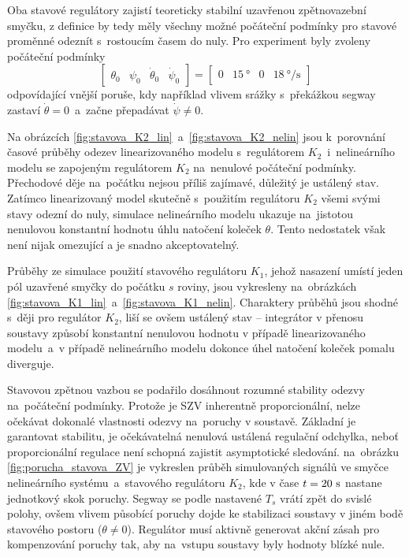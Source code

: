 \documentclass[conference]{IEEEtran}
\begin{document}
Oba stavové regulátory zajistí teoreticky stabilní uzavřenou zpětnovazební smyčku, z definice by tedy měly všechny možné počáteční
podmínky pro stavové proměnné odeznít s~rostoucím časem do nuly. Pro experiment byly zvoleny počáteční podmínky
\begin{equation*}
    \begin{bmatrix}
        \theta_0 & \psi_0 & \dot{\theta}_0 & \dot{\psi}_0
    \end{bmatrix} = \begin{bmatrix}
        0 & 15~\si{\degree} & 0 & 18~\si{\degree\per\second}
    \end{bmatrix}
\end{equation*}
odpovídající vnější poruše, kdy například vlivem srážky s~překážkou segway zastaví $\dot{\theta} = 0$~a~začne přepadávat $\dot{\psi} \neq 0$.


Na obrázcích \ref{fig:stavova_K2_lin}~a~\ref{fig:stavova_K2_nelin}
jsou k~porovnání časové průběhy odezev linearizovaného modelu s~regulátorem $K_2$~i~nelineárního modelu se zapojeným regulátorem $K_2$ na~nenulové počáteční podmínky.
Přechodové děje na~počátku nejsou příliš zajímavé, důležitý je ustálený stav. Zatímco linearizovaný model skutečně s~použitím regulátoru $K_2$ všemi svými stavy 
odezní do nuly, simulace nelineárního modelu ukazuje na~jistotou nenulovou konstantní hodnotu úhlu natočení koleček $\theta$. Tento nedostatek však není nijak omezující
a je snadno akceptovatelný. 


Průběhy ze simulace použití stavového regulátoru $K_1$, jehož nasazení umístí jeden pól uzavřené smyčky do počátku $s$ roviny, jsou vykresleny na~obrázkách 
\ref{fig:stavova_K1_lin}~a~\ref{fig:stavova_K1_nelin}. Charaktery průběhů jsou shodné s~ději pro regulátor $K_2$, liší se ovšem ustálený stav -- integrátor v přenosu
soustavy způsobí konstantní nenulovou hodnotu v případě linearizovaného modelu~a~v případě nelineárního modelu dokonce úhel natočení koleček pomalu diverguje.

Stavovou zpětnou vazbou se podařilo dosáhnout rozumné stability odezvy na~počáteční podmínky. Protože je SZV inherentně proporcionální, nelze očekávat
dokonalé vlastnosti odezvy na~poruchy v soustavě. Základní je garantovat stabilitu, je očekávatelná nenulová ustálená regulační odchylka,
neboť proporcionální regulace není schopná zajistit asymptotické sledování. na~obrázku \ref{fig:porucha_stavova_ZV} je vykreslen průběh simulovaných signálů ve smyčce nelineárního
systému~a~stavového regulátoru $K_2$, kde v čase $t = 20~\text{\si{\second}}$ nastane jednotkový skok poruchy.
Segway se podle nastavené $T_s$ vrátí zpět do svislé polohy, ovšem vlivem působící poruchy dojde ke stabilizaci soustavy v jiném bodě stavového postoru ($\theta \neq 0$).
Regulátor musí aktivně generovat akční zásah pro kompenzování poruchy tak, aby na~vstupu soustavy byly hodnoty blízké nule.
\end{document}
